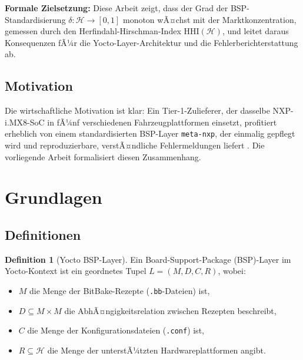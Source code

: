 ﻿\documentclass[a4paper,12pt]{article}
\theoremstyle{definition}
\newtheorem{definition}{Definition}
\begin{document}
\textbf{Formale Zielsetzung:} Diese Arbeit zeigt, dass der Grad der BSP-Standardisierung
$\delta: \mathcal{H} \to [0,1]$ monoton wÃ¤chst mit der Marktkonzentration, gemessen durch
den Herfindahl-Hirschman-Index $\mathrm{HHI}(\mathcal{H})$, und leitet daraus Konsequenzen
fÃ¼r die Yocto-Layer-Architektur und die Fehlerberichterstattung ab.

\subsection{Motivation}

Die wirtschaftliche Motivation ist klar: Ein Tier-1-Zulieferer, der dasselbe NXP-i.MX8-SoC
in fÃ¼nf verschiedenen Fahrzeugplattformen einsetzt, profitiert erheblich von einem
standardisierten BSP-Layer \texttt{meta-nxp}, der einmalig gepflegt wird und
reproduzierbare, verstÃ¤ndliche Fehlermeldungen liefert \cite{openembedded2024}.
Die vorliegende Arbeit formalisiert diesen Zusammenhang.

\section{Grundlagen}

\subsection{Definitionen}

\begin{definition}[Yocto BSP-Layer]
	Ein Board-Support-Package (BSP)-Layer im Yocto-Kontext ist ein geordnetes Tupel
	$L = (M, D, C, R)$, wobei:
	\begin{itemize}
		\item $M$ die Menge der BitBake-Rezepte (\texttt{.bb}-Dateien) ist,
		\item $D \subseteq M \times M$ die AbhÃ¤ngigkeitsrelation zwischen Rezepten beschreibt,
		\item $C$ die Menge der Konfigurationsdateien (\texttt{.conf}) ist,
		\item $R \subseteq \mathcal{H}$ die Menge der unterstÃ¼tzten Hardwareplattformen angibt.
	\end{itemize}
\end{definition}
\end{document}
